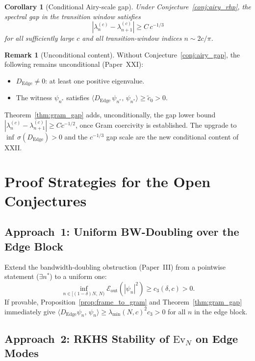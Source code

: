 \documentclass[12pt,a4paper]{amsart}
\newtheorem{corollary}[theorem]{Corollary}
\theoremstyle{definition}
\newtheorem{remark}[theorem]{Remark}
\newcommand{\Ev}{\mathrm{Ev}_N}
\newcommand{\Dedge}{D_{\mathrm{Edge}}}
\newcommand{\lmin}{\lambda_{\min}(N,c)}
\newcommand{\ip}[2]{\langle #1,\, #2\rangle}
\newcommand{\Eout}{\mathcal{E}_{\mathrm{out}}}
\begin{document}
\begin{corollary}[Conditional Airy-scale gap]\label{cor:airy_gap}
Under Conjecture~\ref{conj:airy_rhp}, the spectral gap
in the transition window satisfies
\[
  |\lambda_n^{(c)} - \lambda_{n+1}^{(c)}|
  \ge C\,c^{-1/3}
\]
for all sufficiently large $c$ and all transition-window
indices $n \sim 2c/\pi$.
\end{corollary}

\begin{remark}[Unconditional content]
Without Conjecture~\ref{conj:airy_gap}, the following remains
unconditional (Paper~XXI):
\begin{itemize}
  \item $\Dedge \ne 0$: at least one positive eigenvalue.
  \item The witness $\psi_{n^*}$ satisfies
  $\ip{\Dedge\,\psi_{n^*}}{\psi_{n^*}} \ge \tilde{c}_0 > 0$.
\end{itemize}
Theorem~\ref{thm:gram_gap} adds, unconditionally,
the gap lower bound $|\lambda_n^{(c)}-\lambda_{n+1}^{(c)}|
\ge Cc^{-1/2}$, once Gram coercivity is established.
The upgrade to $\inf\,\sigma(\Dedge) > 0$ and the
$c^{-1/3}$ gap scale are the new conditional content of XXII.
\end{remark}

\section{Proof Strategies for the Open Conjectures}%
\label{sec:strategy}

\subsection{Approach~1: Uniform BW-Doubling over the Edge Block}

Extend the bandwidth-doubling obstruction (Paper~III)
from a pointwise statement ($\exists n^*$) to a uniform one:
\[
  \inf_{n \in [(1-\delta)N,\,N)}
  \Eout(|\psi_n|^2) \ge c_3(\delta,c) > 0.
\]
If provable, Proposition~\ref{prop:frame_to_gram} and
Theorem~\ref{thm:gram_gap} immediately give
$\ip{\Dedge\psi_n}{\psi_n} \ge \lmin^2 c_3 > 0$
for all $n$ in the edge block.

\subsection{Approach~2: RKHS Stability of $\Ev$ on Edge Modes}
\end{document}
